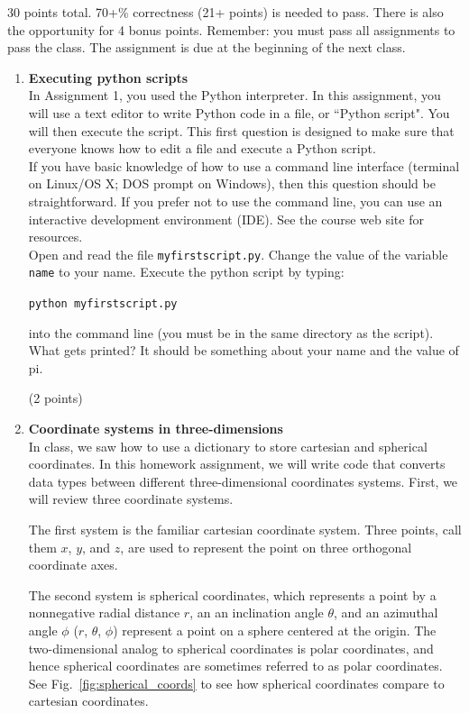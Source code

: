 \documentclass{article}
\newcounter{points}
\newcommand\setpoints[1]{\addtocounter{points}{#1}(#1 points)}
\begin{document}
\pagestyle{fancy}

30 points total.  70+\% correctness (21+ points) is needed to pass.  There is also the opportunity for 4 bonus points.  Remember: you must pass all assignments to pass the class.  The assignment is due at the beginning of the next class.

\begin{enumerate}
\item \textbf{Executing python scripts} \\
In Assignment 1, you used the Python interpreter.  In this assignment, you will use a text editor to write Python code in a file, or ``Python script".  You will then execute the script.  This first question is designed to make sure that everyone knows how to edit a file and execute a Python script. \\

If you have basic knowledge of how to use a command line interface (terminal on Linux/OS X; DOS prompt on Windows), then this question should be straightforward.  If you prefer not to use the command line, you can use an interactive development environment (IDE). See the course web site for resources. \\

Open and read the file \texttt{myfirstscript.py}.  Change the value of the variable \texttt{name} to your name.  Execute the python script by typing:
\begin{center}
\texttt{python myfirstscript.py}
\end{center}
into the command line (you must be in the same directory as the script).  What gets printed?  It should be something about your name and the value of pi.  \setpoints{2}

\item \textbf{Coordinate systems in three-dimensions} \\
In class, we saw how to use a dictionary to store cartesian and spherical coordinates.  In this homework assignment, we will write code that converts data types between different three-dimensional coordinates systems.  First, we will review three coordinate systems.

The first system is the familiar cartesian coordinate system.  Three points, call them $x$, $y$, and $z$, are used to represent the point on three orthogonal coordinate axes.

The second system is spherical coordinates, which represents a point by a nonnegative radial distance $r$, an an inclination angle $\theta$, and an azimuthal angle $\phi$  ($r$, $\theta$, $\phi$) represent a point on a sphere centered at the origin.  The two-dimensional analog to spherical coordinates is polar coordinates, and hence spherical coordinates are sometimes referred to as polar coordinates.  See Fig.~\ref{fig:spherical_coords} to see how spherical coordinates compare to cartesian coordinates.


\end{enumerate}
\end{document}
